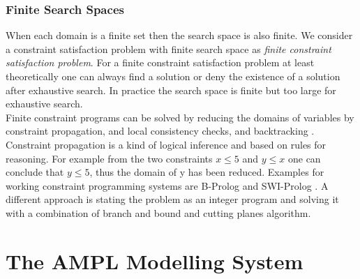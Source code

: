 \subsubsection{Finite Search Spaces}
When each domain is a finite set then the search space is also finite. We consider a constraint satisfaction problem with finite search space as \emph{finite constraint satisfaction problem}. For a finite constraint satisfaction problem at least theoretically one can always find a solution or deny the existence of a solution after exhaustive search. In practice the search space is finite but too large for exhaustive search.\\
Finite constraint programs can be solved by reducing the domains of variables by constraint propagation, and local consistency checks, and backtracking \cite{ConstraintPropagation}. Constraint propagation is a kind of logical inference and based on rules for reasoning. For example from the two constraints $x\leq 5$ and $y \leq x$ one can conclude that $y\leq 5$, thus the domain of y has been reduced. Examples for working constraint programming systems are B-Prolog and SWI-Prolog \cite{citation needed}. %
A different approach is stating the problem as an integer program and solving it with a combination of branch and bound and cutting planes algorithm.


\section{The AMPL Modelling System}
\label{sec:AMPL}
\cite{AMPL}

